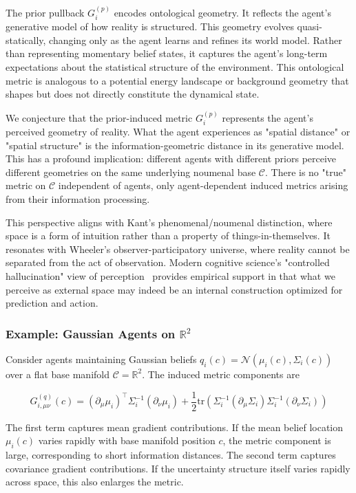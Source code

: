 \documentclass[11pt]{article}
\begin{document}
The prior pullback $G_i^{(p)}$ encodes ontological geometry. It reflects the agent's generative model of how reality is structured. This geometry evolves quasi-statically, changing only as the agent learns and refines its world model. Rather than representing momentary belief states, it captures the agent's long-term expectations about the statistical structure of the environment. This ontological metric is analogous to a potential energy landscape or background geometry that shapes but does not directly constitute the dynamical state.

We conjecture that the prior-induced metric $G_i^{(p)}$ represents the agent's perceived geometry of reality. What the agent experiences as "spatial distance" or "spatial structure" is the information-geometric distance in its generative model. This has a profound implication: different agents with different priors perceive different geometries on the same underlying noumenal base $\mathcal{C}$. There is no "true" metric on $\mathcal{C}$ independent of agents, only agent-dependent induced metrics arising from their information processing.

This perspective aligns with Kant's phenomenal/noumenal distinction, where space is a form of intuition rather than a property of things-in-themselves. It resonates with Wheeler's observer-participatory universe, where reality cannot be separated from the act of observation. Modern cognitive science's "controlled hallucination" view of perception~\cite{Clark2016,Hoffman2019} provides empirical support in that what we perceive as external space may indeed be an internal construction optimized for prediction and action.

\subsubsection{Example: Gaussian Agents on $\mathbb{R}^2$}

Consider agents maintaining Gaussian beliefs $q_i(c) = \mathcal{N}(\mu_i(c), \Sigma_i(c))$ over a flat base manifold $\mathcal{C} = \mathbb{R}^2$. The induced metric components are

\begin{equation}
G^{(q)}_{i,\mu\nu}(c) = (\partial_\mu \mu_i)^\top \Sigma_i^{-1} (\partial_\nu \mu_i) + \frac{1}{2}\mathrm{tr}\left(\Sigma_i^{-1}(\partial_\mu \Sigma_i)\Sigma_i^{-1}(\partial_\nu \Sigma_i)\right)
\end{equation}

The first term captures mean gradient contributions. If the mean belief location $\mu_i(c)$ varies rapidly with base manifold position $c$, the metric component is large, corresponding to short information distances. The second term captures covariance gradient contributions. If the uncertainty structure itself varies rapidly across space, this also enlarges the metric.
\end{document}
